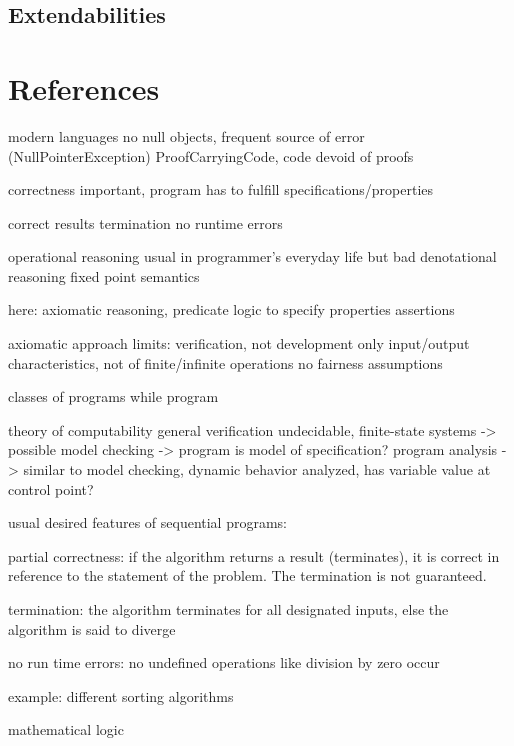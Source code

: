 \section{Extendabilities}

\chapter{References}

modern languages no null objects, frequent source of error (NullPointerException)
ProofCarryingCode, code devoid of proofs

correctness important, program has to fulfill specifications/properties

correct results
termination
no runtime errors

operational reasoning usual in programmer's everyday life but bad
denotational reasoning
fixed point semantics

here: axiomatic reasoning, predicate logic to specify properties
assertions

axiomatic approach limits:
verification, not development
only input/output characteristics, not of finite/infinite operations
no fairness assumptions


classes of programs
while program

theory of computability general verification undecidable, finite-state systems -> possible
model checking -> program is model of specification?
program analysis -> similar to model checking, dynamic behavior analyzed, has variable value at control point?




usual desired features of sequential programs:

partial correctness: if the algorithm returns a result (terminates),
it is correct in reference to the statement of the problem. The termination
is not guaranteed.

termination: the algorithm terminates for all designated inputs, else
the algorithm is said to diverge

no run time errors: no undefined operations like division by zero
occur

example: different sorting algorithms

mathematical logic

